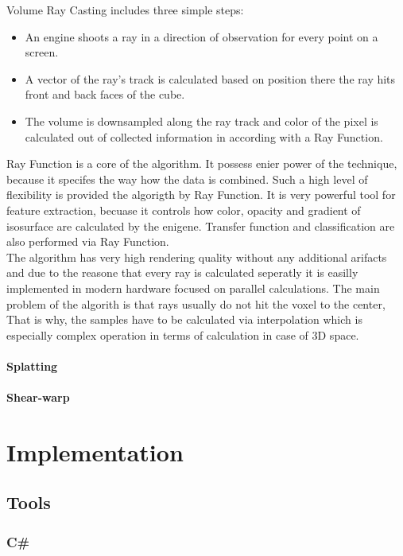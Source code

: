 \documentclass[twoside, english, 11pt]{report}
\begin{document}
Volume Ray Casting includes three simple steps:
\begin{itemize}
\item An engine shoots a ray in a direction of observation for every point on a screen.
\item A vector of the ray's track is calculated based on position there the ray hits front and back faces of the cube.
\item The volume is downsampled along the ray track and color of the pixel is calculated out of collected information in according with a Ray Function.
\end{itemize}

Ray Function is a core of the algorithm. It possess enier power of the technique, because it specifes the way how the data is combined. Such a high level of flexibility is provided the algorigth by Ray Function. It is very powerful tool for feature extraction, becuase it controls how color, opacity and gradient of isosurface are calculated by the enigene. Transfer function and classification are also performed via Ray Function.\\

The algorithm has very high rendering quality without any additional arifacts and due to the reasone that every ray is calculated seperatly it is easilly implemented in modern hardware focused on parallel calculations. The main problem of the algorith is that rays usually  do not hit the voxel to the center, That is why, the samples have to be calculated via interpolation which is especially complex operation in terms of calculation in case of 3D space.

 
\subsubsection{Splatting}
\subsubsection{Shear-warp}

\chapter{Implementation}
\section{Tools}
\subsection{C\#}
\end{document}
